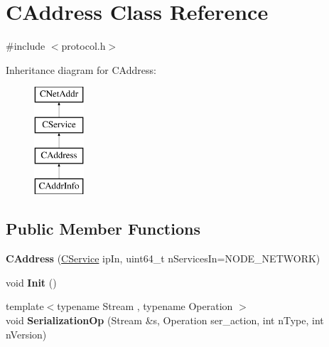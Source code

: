 \hypertarget{class_c_address}{}\section{C\+Address Class Reference}
\label{class_c_address}


{\ttfamily \#include $<$protocol.\+h$>$}

Inheritance diagram for C\+Address\+:\begin{figure}[H]
\begin{center}
\leavevmode
\includegraphics[height=4.000000cm]{class_c_address}
\end{center}
\end{figure}
\subsection*{Public Member Functions}
\begin{DoxyCompactItemize}
\item 
\mbox{\label{class_c_address_a806e75f363ec49bfab92a686a8774ac3}} 
{\bfseries C\+Address} (\mbox{\hyperlink{class_c_service}{C\+Service}} ip\+In, uint64\+\_\+t n\+Services\+In=N\+O\+D\+E\+\_\+\+N\+E\+T\+W\+O\+RK)
\item 
\mbox{\label{class_c_address_ac060c84dcf47b8ccfae0142c9b29a243}} 
void {\bfseries Init} ()
\item 
\mbox{\label{class_c_address_aec10c7075404eefbcf6f7a4c5671be02}} 
{\footnotesize template$<$typename Stream , typename Operation $>$ }\\void {\bfseries Serialization\+Op} (Stream \&s, Operation ser\+\_\+action, int n\+Type, int n\+Version)
\end{DoxyCompactItemize}
